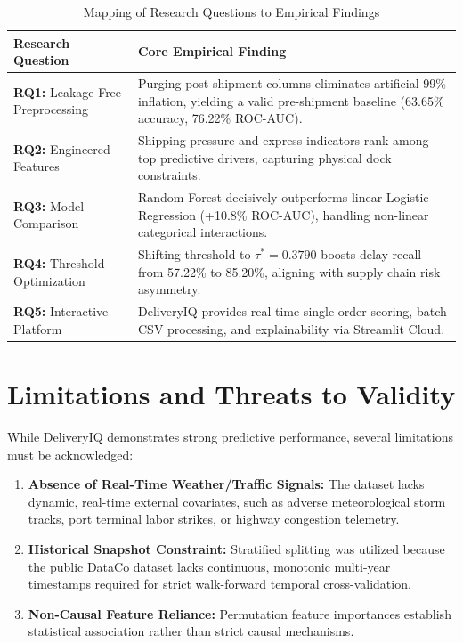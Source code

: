 \documentclass[journal,10pt,twocolumn]{IEEEtran}
\begin{document}
\begin{table}[htbp]
\caption{Mapping of Research Questions to Empirical Findings}
\label{tab:rq_mapping}
\centering
\begin{tabularx}{\columnwidth}{lX}
\toprule
\textbf{Research Question} & \textbf{Core Empirical Finding} \\
\midrule
\textbf{RQ1:} Leakage-Free Preprocessing & Purging post-shipment columns eliminates artificial 99\% inflation, yielding a valid pre-shipment baseline (63.65\% accuracy, 76.22\% ROC-AUC). \\
\addlinespace
\textbf{RQ2:} Engineered Features & Shipping pressure and express indicators rank among top predictive drivers, capturing physical dock constraints. \\
\addlinespace
\textbf{RQ3:} Model Comparison & Random Forest decisively outperforms linear Logistic Regression (+10.8\% ROC-AUC), handling non-linear categorical interactions. \\
\addlinespace
\textbf{RQ4:} Threshold Optimization & Shifting threshold to $\tau^* = 0.3790$ boosts delay recall from 57.22\% to 85.20\%, aligning with supply chain risk asymmetry. \\
\addlinespace
\textbf{RQ5:} Interactive Platform & DeliveryIQ provides real-time single-order scoring, batch CSV processing, and explainability via Streamlit Cloud. \\
\bottomrule
\end{tabularx}
\end{table}

\section{Limitations and Threats to Validity}
\label{sec:limitations}

While DeliveryIQ demonstrates strong predictive performance, several limitations must be acknowledged:
\begin{enumerate}
    \item \textbf{Absence of Real-Time Weather/Traffic Signals:} The dataset lacks dynamic, real-time external covariates, such as adverse meteorological storm tracks, port terminal labor strikes, or highway congestion telemetry.
    \item \textbf{Historical Snapshot Constraint:} Stratified splitting was utilized because the public DataCo dataset lacks continuous, monotonic multi-year timestamps required for strict walk-forward temporal cross-validation.
    \item \textbf{Non-Causal Feature Reliance:} Permutation feature importances establish statistical association rather than strict causal mechanisms.
\end{enumerate}
\end{document}
